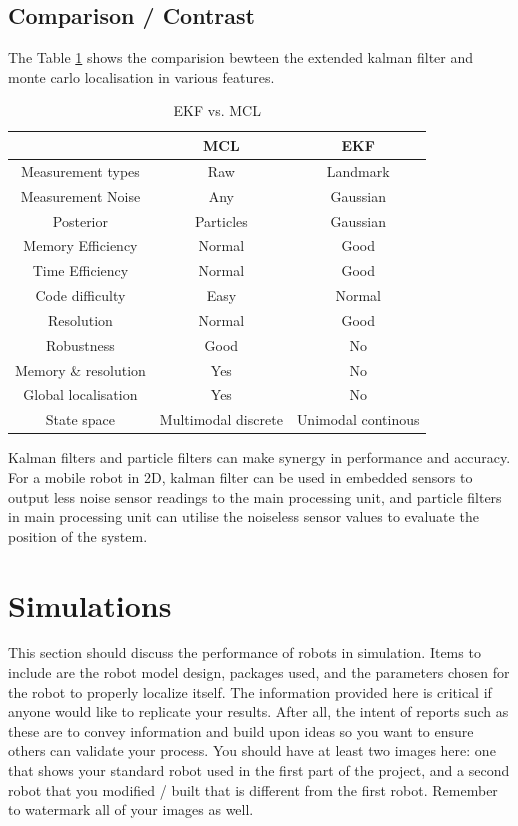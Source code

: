 \documentclass[10pt,journal,compsoc]{IEEEtran}
\begin{document}
\subsection{Comparison / Contrast}

The Table \ref{table:comparison_ekf_mcl} shows the comparision bewteen the extended kalman filter and monte carlo localisation in various features.
\begin{table}[ht]
      \caption{EKF vs. MCL}
      \label{table:comparison_ekf_mcl}
      \begin{center}
      \begin{tabular}{|c|c|c|}
      \hline
       & MCL & EKF \\
      \hline\hline
      Measurement types & Raw & Landmark \\
      \hline
      Measurement Noise & Any &  Gaussian \\
      \hline
      Posterior & Particles &  Gaussian \\
      \hline
      Memory Efficiency & Normal &  Good \\
      \hline
      Time Efficiency & Normal &  Good \\
      \hline
      Code difficulty & Easy &  Normal \\
      \hline
      Resolution & Normal &  Good \\
      \hline
      Robustness & Good &  No \\
      \hline
      Memory \& resolution & Yes &  No \\
      \hline
      Global localisation & Yes &  No \\
      \hline
      State space & Multimodal discrete &  Unimodal continous \\
      \hline
      \end{tabular}
      \end{center}
\end{table}


Kalman filters and particle filters can make synergy in performance and accuracy.  For a mobile robot in 2D, kalman filter can be used in embedded sensors to output less noise sensor readings to the main processing unit, and particle filters in main processing unit can utilise the noiseless sensor values to evaluate the position of the system.

\section{Simulations}
This section should discuss the performance of robots in simulation. Items to include are the robot model design, packages used, and the parameters chosen for the robot to properly localize itself. The information provided here is critical if anyone would like to replicate your results. After all, the intent of reports such as these are to convey information and build upon ideas so you want to ensure others can validate your process.
You should have at least two images here: one that shows your standard robot used in the first part of the project, and a second robot that you modified / built that is different from the first robot. Remember to watermark all of your images as well. 
\end{document}
